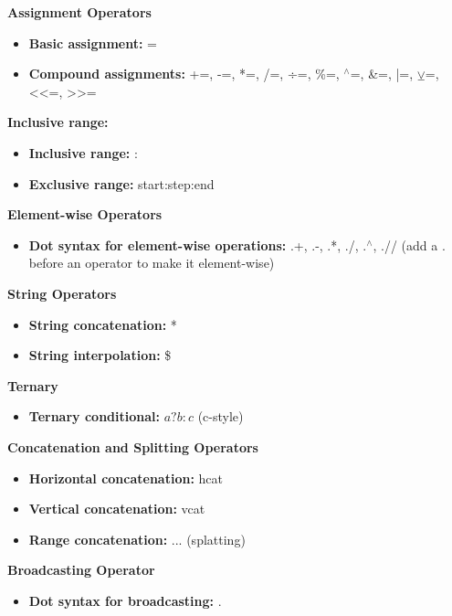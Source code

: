 \documentclass{report}
\begin{document}
    \bigbreak \noindent 
    \textbf{Assignment Operators}
    \begin{itemize}
        \item \textbf{Basic assignment:} =
        \item \textbf{Compound assignments:} +=, -=, *=, /=, ÷=, \%=, $^{\land}$=, \&=, |=, $\veebar$=, <<=, >>=
    \end{itemize}
    \bigbreak \noindent 
    \textbf{Inclusive range:}
    \begin{itemize}
        \item \textbf{Inclusive range:} :
        \item \textbf{Exclusive range:} start:step:end
    \end{itemize}

    \bigbreak \noindent 
    \textbf{Element-wise Operators}
    \begin{itemize}
        \item \textbf{Dot syntax for element-wise operations:} .+, .-, .*, ./, .$^{\land}$, .// (add a . before an operator to make it element-wise)
    \end{itemize}
    \bigbreak \noindent 
    \textbf{String Operators}
    \begin{itemize}
        \item \textbf{String concatenation:} *
        \item \textbf{String interpolation:} \$
    \end{itemize}
    \bigbreak \noindent 
    \textbf{Ternary}
    \begin{itemize}
        \item \textbf{Ternary conditional:} $a ? b : c $ (c-style)
    \end{itemize}
    \bigbreak \noindent 
    \textbf{Concatenation and Splitting Operators}
    \begin{itemize}
        \item \textbf{Horizontal concatenation:} hcat
        \item \textbf{Vertical concatenation:} vcat
        \item \textbf{Range concatenation:} ... (splatting)
    \end{itemize}
    \bigbreak \noindent 
    \textbf{ Broadcasting Operator}
    \begin{itemize}
        \item \textbf{Dot syntax for broadcasting:} .
    \end{itemize}


    \bigbreak \noindent 
\end{document}
